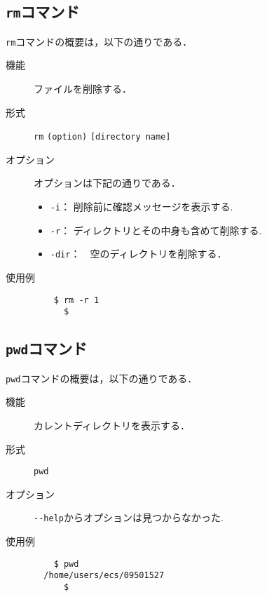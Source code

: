 \documentclass[a4j,11pt]{jarticle}
\begin{document}
\subsection{\texttt{rm}コマンド}
\verb|rm|コマンドの概要は，以下の通りである．
\begin{description}
  \item[機能] %
    ファイルを削除する．
  \item[形式] %
    \verb|rm| \verb|(option)| \verb|[directory name]|
  \item[オプション] %
    オプションは下記の通りである．
    \begin{itemize}
      \item \verb|-i|：  削除前に確認メッセージを表示する.
      \item \verb|-r|：  ディレクトリとその中身も含めて削除する.
      \item \verb|-dir|：　空のディレクトリを削除する．
    \end{itemize}
  \item[使用例] %
    \begin{verbatim}
    $ rm -r 1
      $
    \end{verbatim}
\end{description}

\subsection{\texttt{pwd}コマンド}
\verb|pwd|コマンドの概要は，以下の通りである．
\begin{description}
  \item[機能] %
    カレントディレクトリを表示する．
  \item[形式] %
    \verb|pwd|
  \item[オプション] %
    \verb|--help|からオプションは見つからなかった.
  \item[使用例] %
    \begin{verbatim}
    $ pwd
  /home/users/ecs/09501527
      $
    \end{verbatim}
\end{description}
\end{document}
